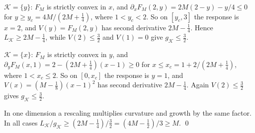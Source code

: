 $\mathcal K=\{y\}$: $F_M$ is strictly convex in $x$, and
$\partial_xF_M(2,y)=2M(2-y)-y/4\le0$ for $y\ge y_c=4M/(2M+\frac14)$, where
$1<y_c<2$. So on $[y_c,3]$ the response is $x=2$, and $V(y)=F_M(2,y)$ has
second derivative $2M-\frac14$. Hence $L_{\mathcal K}\ge2M-\frac14$, while
$V(2)\le\frac32$ and $V(1)=0$ give $g_{\mathcal K}\le\frac32$.

$\mathcal K=\{x\}$: $F_M$ is strictly convex in $y$, and
$\partial_yF_M(x,1)=2-(2M+\frac14)(x-1)\ge0$ for
$x\le x_c=1+2/(2M+\frac14)$, where $1<x_c\le2$. So on $[0,x_c]$ the response
is $y=1$, and $V(x)=(M-\frac18)(x-1)^2$ has second derivative $2M-\frac14$.
Again $V(2)\le\frac32$ gives $g_{\mathcal K}\le\frac32$.

In one dimension a rescaling multiplies curvature and growth by the same
factor. In all cases
$L_{\mathcal K}/g_{\mathcal K}\ge(2M-\frac14)/\frac32=(4M-\frac12)/3\ge M$.
\qed
